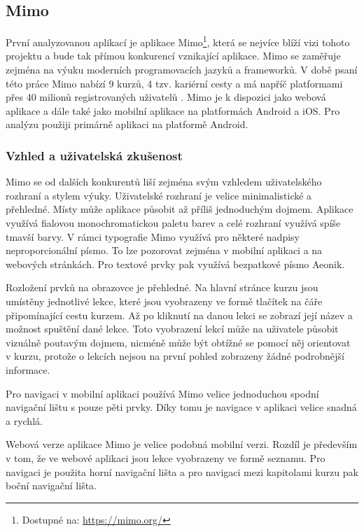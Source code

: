 \subsection{Mimo}

První analyzovanou aplikací je aplikace Mimo\footnote{Dostupné na: \href{https://mimo.org/}{https://mimo.org/}}, která se nejvíce blíží vizi tohoto projektu a bude tak přímou konkurencí vznikající aplikace. Mimo se zaměřuje zejména na výuku moderních programovacích jazyků a frameworků. V době psaní této práce Mimo nabízí 9 kurzů, 4 tzv. kariérní cesty a má napříč platformami přes 40 milionů registrovaných uživatelů \cite{Mimo}. Mimo je k dispozici jako webová aplikace a dále také jako mobilní aplikace na platformách Android a iOS. Pro analýzu použiji primárně aplikaci na platformě Android.

\subsubsection{Vzhled a uživatelská zkušenost}

Mimo se od dalších konkurentů liší zejména svým vzhledem uživatelského rozhraní a stylem výuky. Uživatelské rozhraní je velice minimalistické a přehledné. Místy může aplikace působit až příliš jednoduchým dojmem. Aplikace využívá fialovou monochromatickou paletu barev a celé rozhraní využívá spíše tmavší barvy. V rámci typografie Mimo využívá pro některé nadpisy neproporcionální písmo. To lze pozorovat zejména v mobilní aplikaci a na webových stránkách. Pro textové prvky pak využívá bezpatkové písmo Aeonik.

Rozložení prvků na obrazovce je přehledné. Na hlavní stránce kurzu jsou umístěny jednotlivé lekce, které jsou vyobrazeny ve formě tlačítek na čáře připomínající cestu kurzem. Až po kliknutí na danou lekci se zobrazí její název a možnost spuštění dané lekce. Toto vyobrazení lekcí může na uživatele působit vizuálně poutavým dojmem, nicméně může být obtížné se pomocí něj orientovat v kurzu, protože o lekcích nejsou na první pohled zobrazeny žádné podrobnější informace.

Pro navigaci v mobilní aplikaci používá Mimo velice jednoduchou spodní navigační lištu s pouze pěti prvky. Díky tomu je navigace v aplikaci velice snadná a rychlá.

Webová verze aplikace Mimo je velice podobná mobilní verzi. Rozdíl je především v tom, že ve webové aplikaci jsou lekce vyobrazeny ve formě seznamu. Pro navigaci je použita horní navigační lišta a pro navigaci mezi kapitolami kurzu pak boční navigační lišta.

